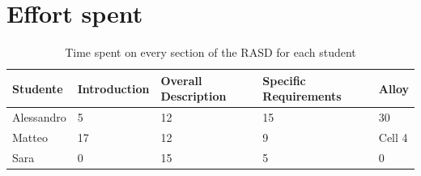\documentclass[12pt,a4paper]{article}
\begin{document}
\section{Effort spent}
\begin{table}[h]
  \centering
  \begin{tabular}{|p{1.5cm}|p{1.5cm}|p{1.5cm}|p{1.5cm}|p{1.5cm}|}
    \hline
     Studente & Introduction & Overall Description & Specific Requirements & Alloy \\
    \hline
    Alessandro & 5 & 12 & 15 & 30 \\
    \hline
    Matteo & 17 & 12 & 9 & Cell 4 \\
    \hline
    Sara & 0 & 15 & 5 & 0 \\
    \hline
  \end{tabular}
  \caption{Time spent on every section of the RASD for each student}
  \label{tab:effort}
\end{table}

\clearpage
\end{document}
